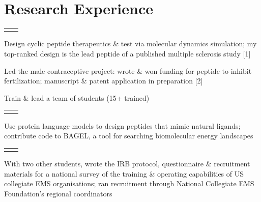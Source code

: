 \documentclass[a4paper,11pt]{article}
\makeatletter
\newcommand{\cvsection}[1]{\Needspace{4\baselineskip}\section*{#1}}
\newcommand{\entry}[4]{%
  \Needspace{4\baselineskip}%
  \begin{tabularx}{\linewidth}{@{}>{\raggedright\arraybackslash}X
    >{\raggedleft\arraybackslash}p{33mm}@{}}%
    \textbf{#1} & {\small #2}\\%
    \multicolumn{2}{@{}p{\linewidth}@{}}{{\small #3\if\relax\detokenize{#4}\relax\else\enspace|\enspace #4\fi}}%
  \end{tabularx}\par
}
\newcommand{\gap}{\vspace{3pt}}
\makeatother
\begin{document}
\cvsection{Research Experience}
\entry{Undergraduate Researcher \& Computational Biology Team Lead}
  {Oct 2023 -- Present}
  {KumarLab, PI: Dr Vivek Kumar, University of Houston (previously NJIT)}{}
\begin{cvitems}
  \item Design cyclic peptide therapeutics \& test via molecular dynamics simulation;
    my top-ranked design is the lead peptide of a published multiple sclerosis study [1]
  \item Led the male contraceptive project: wrote \& won funding for peptide to inhibit
    fertilization; manuscript \& patent application in preparation [2]
  \item Train \& lead a team of students (15+ trained)
\end{cvitems}
\gap
\entry{Undergraduate Researcher (UROP), Computational Bionanotechnology}
  {Jun 2026 -- Present}
  {Imperial College London, Department of Materials; PI: Prof. Stefano Angioletti-Uberti}{}
\begin{cvitems}
  \item Use protein language models to design peptides that mimic natural ligands;
    contribute code to BAGEL, a tool for searching biomolecular energy landscapes
\end{cvitems}
\gap
\entry{Student Researcher, collegiate EMS operating models}
  {Sep 2025 -- May 2026}
  {NJIT, School of Applied Engineering \& Technology; PI: Dr Chang Yaramothu}{}
\begin{cvitems}
  \item With two other students, wrote the IRB protocol, questionnaire \& recruitment
    materials for a national survey of the training \& operating capabilities of US
    collegiate EMS organisations; ran recruitment through National Collegiate EMS
    Foundation's regional coordinators
\end{cvitems}
\end{document}
